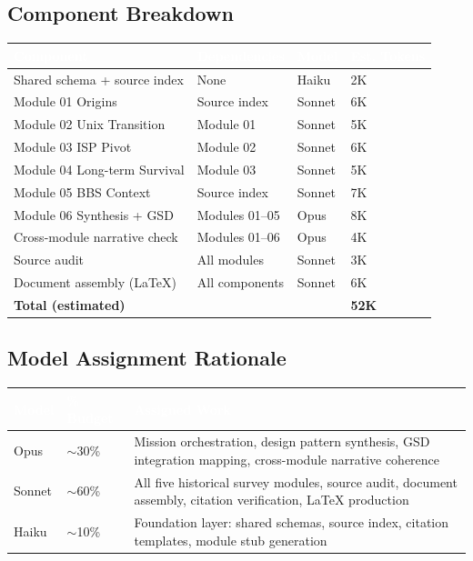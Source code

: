 \documentclass[11pt,letterpaper]{article}
\newcommand{\tableheader}[1]{\textbf{\sffamily\textcolor{white}{#1}}}
\begin{document}
\subsection{Component Breakdown}

\begin{center}
\begin{tabularx}{\textwidth}{L{3cm}L{3cm}C{2cm}C{2cm}}
\toprule
{}
\tableheader{Component} & \tableheader{Dependencies} & \tableheader{Model} & \tableheader{Est. Tokens} \\
\midrule
Shared schema + source index & None & Haiku & 2K \\
Module 01 Origins & Source index & Sonnet & 6K \\
Module 02 Unix Transition & Module 01 & Sonnet & 5K \\
Module 03 ISP Pivot & Module 02 & Sonnet & 6K \\
Module 04 Long-term Survival & Module 03 & Sonnet & 5K \\
Module 05 BBS Context & Source index & Sonnet & 7K \\
Module 06 Synthesis + GSD & Modules 01--05 & Opus & 8K \\
Cross-module narrative check & Modules 01--06 & Opus & 4K \\
Source audit & All modules & Sonnet & 3K \\
Document assembly (LaTeX) & All components & Sonnet & 6K \\
\midrule
\textbf{Total (estimated)} & & & \textbf{52K} \\
\bottomrule
\end{tabularx}
\end{center}

\subsection{Model Assignment Rationale}

\begin{center}
\begin{tabularx}{\textwidth}{L{2.5cm}L{2cm}X}
\toprule
{}
\tableheader{Model} & \tableheader{\% Budget} & \tableheader{Assigned Work} \\
\midrule
Opus & $\sim$30\% & Mission orchestration, design pattern synthesis, GSD integration mapping, cross-module narrative coherence \\
Sonnet & $\sim$60\% & All five historical survey modules, source audit, document assembly, citation verification, LaTeX production \\
Haiku & $\sim$10\% & Foundation layer: shared schemas, source index, citation templates, module stub generation \\
\bottomrule
\end{tabularx}
\end{center}
\end{document}
